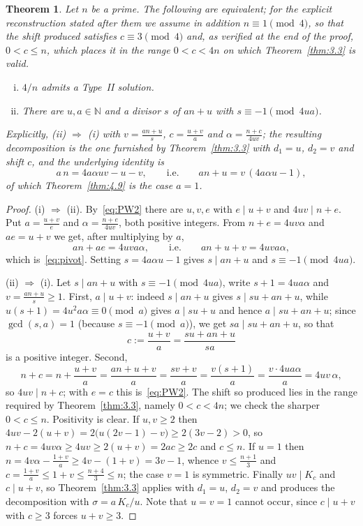 \documentclass[11pt, a4paper]{article}
\theoremstyle{plain}
\newtheorem{theorem}{Theorem}[section]
\theoremstyle{definition}
\newcommand{\N}{\mathbb{N}}
\begin{document}
\begin{theorem}\label{thm:gen_criterion}
Let $n$ be a prime. The following are equivalent; for the explicit reconstruction stated after them we assume in addition $n\equiv1\pmod4$, so that the shift produced satisfies $c\equiv3\pmod4$ and, as verified at the end of the proof, $0<c\le n$, which places it in the range $0<c<4n$ on which Theorem~\ref{thm:3.3} is valid.
\begin{enumerate}[(i)]
    \item $4/n$ admits a Type~II solution.
    \item There are $u,a\in\N$ and a divisor $s$ of $an+u$ with $s\equiv-1 \pmod{4ua}$.
\end{enumerate}
Explicitly, (ii) $\Rightarrow$ (i) with $v=\frac{an+u}{s}$, $c=\frac{u+v}{a}$ and $\alpha=\frac{n+c}{4uv}$; the resulting decomposition is the one furnished by Theorem~\ref{thm:3.3} with $d_1=u$, $d_2=v$ and shift $c$, and the underlying identity is
\begin{equation}\label{eq:pivot}
a\,n=4a\alpha uv-u-v,\qquad\text{i.e.}\qquad an+u=v\,(4a\alpha u-1),
\end{equation}
of which Theorem~\ref{thm:4.9} is the case $a=1$.
\end{theorem}
\begin{proof}
(i) $\Rightarrow$ (ii). By~\eqref{eq:PW2} there are $u,v,e$ with $e\mid u+v$ and $4uv\mid n+e$. Put $a=\frac{u+v}{e}$ and $\alpha=\frac{n+e}{4uv}$, both positive integers. From $n+e=4uv\alpha$ and $ae=u+v$ we get, after multiplying by $a$,
$$an+ae=4uva\alpha,\qquad\text{i.e.}\qquad an+u+v=4uva\alpha,$$
which is~\eqref{eq:pivot}. Setting $s=4a\alpha u-1$ gives $s\mid an+u$ and $s\equiv-1\pmod{4ua}$.

(ii) $\Rightarrow$ (i). Let $s\mid an+u$ with $s\equiv-1\pmod{4ua}$, write $s+1=4ua\alpha$ and $v=\frac{an+u}{s}\ge1$. First, $a\mid u+v$: indeed $s\mid an+u$ gives $s\mid su+an+u$, while $u(s+1)=4u^{2}a\alpha\equiv0\pmod a$ gives $a\mid su+u$ and hence $a\mid su+an+u$; since $\gcd(s,a)=1$ (because $s\equiv-1\pmod a$), we get $sa\mid su+an+u$, so that
$$c:=\frac{u+v}{a}=\frac{su+an+u}{sa}$$
is a positive integer. Second,
$$n+c=n+\frac{u+v}{a}=\frac{an+u+v}{a}=\frac{sv+v}{a}=\frac{v(s+1)}{a}=\frac{v\cdot4ua\alpha}{a}=4uv\,\alpha,$$
so $4uv\mid n+c$; with $e=c$ this is~\eqref{eq:PW2}. The shift so produced lies in the range required by Theorem~\ref{thm:3.3}, namely $0<c<4n$; we check the sharper $0<c\le n$. Positivity is clear. If $u,v\ge2$ then $4uv-2(u+v)=2\big(u(2v-1)-v\big)\ge2(3v-2)>0$, so $n+c=4uv\alpha\ge4uv\ge2(u+v)=2ac\ge2c$ and $c\le n$. If $u=1$ then $n=4v\alpha-\frac{1+v}{a}\ge4v-(1+v)=3v-1$, whence $v\le\frac{n+1}{3}$ and $c=\frac{1+v}{a}\le1+v\le\frac{n+4}{3}\le n$; the case $v=1$ is symmetric. Finally $uv\mid K_c$ and $c\mid u+v$, so Theorem~\ref{thm:3.3} applies with $d_1=u$, $d_2=v$ and produces the decomposition with $\sigma=a\,K_c/u$. Note that $u=v=1$ cannot occur, since $c\mid u+v$ with $c\ge3$ forces $u+v\ge3$.
\end{proof}
\end{document}
